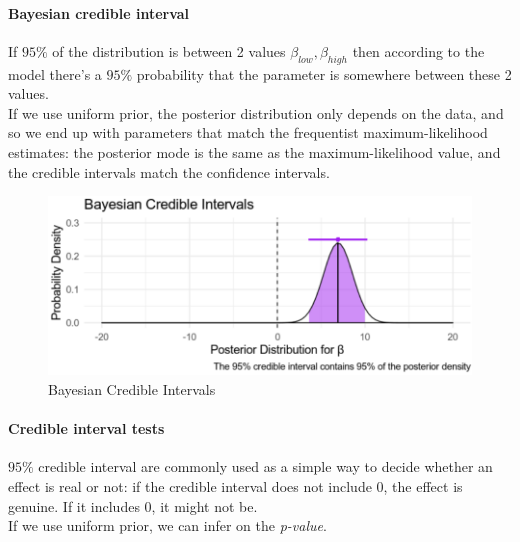 \paragraph{Bayesian credible interval}
If $95\%$ of the distribution is between 2 values $\beta_{low}, \beta_{high}$ then 
according to the model there's a $95\%$ probability that the parameter is somewhere 
between these 2 values.\\
If we use uniform prior, the posterior distribution only depends on the data, and so we
end up with parameters that match the frequentist maximum-likelihood estimates: the 
posterior mode is the same as the maximum-likelihood value, and the credible intervals 
match the confidence intervals.
\begin{figure}[H]
	\begin{center}
		\includegraphics[width=\textwidth]{./chaps/10sec/images/1_credible_interval.png}
	\end{center}
	\caption{Bayesian Credible Intervals}
	\label{fig:1_credible_interval}
\end{figure}

\paragraph{Credible interval tests}
$95\%$ credible interval are commonly used as a simple way to decide whether an effect is
real or not: if the credible interval does not include 0, the effect is genuine. If it 
includes 0, it might not be.\\
If we use uniform prior, we can infer on the \emph{p-value}.

